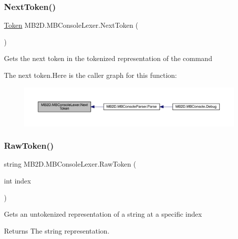 \subsubsection{\texorpdfstring{Next\+Token()}{NextToken()}}
{\footnotesize\ttfamily \hyperlink{namespace_m_b2_d_ab170e7e7db86e5ccb0ae156c0d9a6002}{Token} M\+B2\+D.\+M\+B\+Console\+Lexer.\+Next\+Token (\begin{DoxyParamCaption}{ }\end{DoxyParamCaption})\hspace{0.3cm}{\ttfamily [inline]}}



Gets the next token in the tokenized representation of the command 

The next token.Here is the caller graph for this function\+:\nopagebreak
\begin{figure}[H]
\begin{center}
\leavevmode
\includegraphics[width=350pt]{class_m_b2_d_1_1_m_b_console_lexer_ab083ced0d68a7f7278fbb462a9c60410_icgraph}
\end{center}
\end{figure}
\hypertarget{class_m_b2_d_1_1_m_b_console_lexer_a9f08e0a2739eb027f6b8c46abe67f647}{}\label{class_m_b2_d_1_1_m_b_console_lexer_a9f08e0a2739eb027f6b8c46abe67f647} 
\subsubsection{\texorpdfstring{Raw\+Token()}{RawToken()}}
{\footnotesize\ttfamily string M\+B2\+D.\+M\+B\+Console\+Lexer.\+Raw\+Token (\begin{DoxyParamCaption}\item[{int}]{index }\end{DoxyParamCaption})\hspace{0.3cm}{\ttfamily [inline]}}



Gets an untokenized representation of a string at a specific index 

\begin{DoxyReturn}{Returns}
The string representation.
\end{DoxyReturn}

